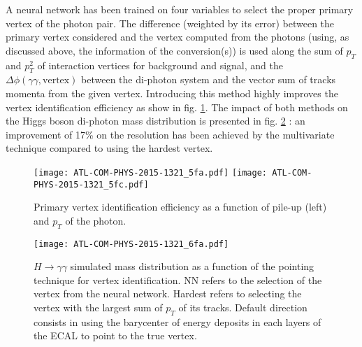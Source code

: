 A neural network \cite{ATL-COM-PHYS-2015-1321} has been trained on four variables to select the proper primary vertex of the photon pair.
The difference (weighted by its error)  between the primary vertex considered and the vertex computed from the photons (using, as discussed above, the information of the conversion(s)) is used along the sum of \(p_T\) and \(p_T^2\) of interaction vertices for background and signal, and the $\Delta\phi(\gamma\gamma,\text{vertex})$ between the di-photon system and the vector sum of tracks momenta from the given vertex.
Introducing this method highly improves the vertex identification efficiency as show in fig. \ref{fig:Calibration_RecoID_NNPointingEff}.
The impact of both methods on the Higgs boson di-photon mass distribution is presented in fig. \ref{fig:Calibration_RecoID_NNPointingMass} : an improvement of 17\% on the resolution has been achieved by the multivariate technique compared to using the hardest vertex.

\begin{figure}
  \centering
  \texttt{[image: ATL-COM-PHYS-2015-1321\_5fa.pdf]}
  \texttt{[image: ATL-COM-PHYS-2015-1321\_5fc.pdf]}
  \caption{Primary vertex identification efficiency as a function of pile-up (left) and $p_T$ of the photon.\cite{ATL-COM-PHYS-2015-1321}}
  \label{fig:Calibration_RecoID_NNPointingEff}
\end{figure}

\begin{figure}
  \centering
  \texttt{[image: ATL-COM-PHYS-2015-1321\_6fa.pdf]}
  \caption{$H\rightarrow\gamma\gamma$ simulated mass distribution as a function of the pointing technique for vertex identification.
    NN refers to the selection of the vertex from the neural network.
    Hardest refers to selecting the vertex with the largest sum of $p_T$ of its tracks.
    Default direction consists in using the barycenter of energy deposits in each layers of the ECAL to point to the true vertex.
    \cite{ATL-COM-PHYS-2015-1321}}
  \label{fig:Calibration_RecoID_NNPointingMass}
\end{figure}


